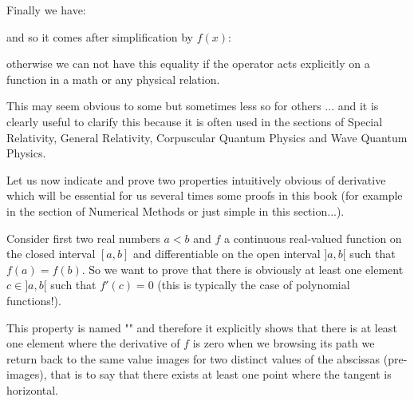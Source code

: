 Finally we have:
	
and so it comes after simplification by $f(x)$:
	
otherwise we can not have this equality if the operator acts explicitly on a function in a math or any physical relation.

This may seem obvious to some but sometimes less so for others ... and it is clearly useful to clarify this because it is often used in the sections of Special Relativity, General Relativity, Corpuscular Quantum Physics and Wave Quantum Physics.

Let us now indicate and prove two properties intuitively obvious of derivative which will be essential for us several times some proofs in this book (for example in the section  of Numerical Methods or just simple in this section...).

\begin{theorem}
Consider first two real numbers $a<b$ and $f$ a continuous real-valued function on the closed interval $[a, b]$ and differentiable on the open interval $]a, b[$ such that $f(a)=f(b)$. So we want to prove that there is obviously  at least one element $c \in ]a, b[$ such that $f'(c)=0$ (this is typically the case of polynomial functions!).

This property is named "" and therefore it explicitly shows that there is at least one element where the derivative of $f$ is zero when we browsing its path we return back to the same value images for two distinct values of the abscissas (pre-images), that is to say that there exists at least one point where the tangent is horizontal.
\end{theorem}

